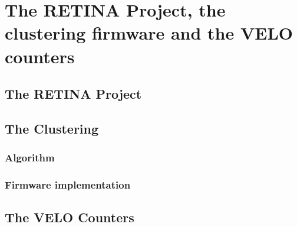 
\chapter{The RETINA Project, the clustering firmware and the VELO counters}
\label{chp:retina}
\section{The RETINA Project}
\section{The Clustering}
\subsection{Algorithm}
\subsection{Firmware implementation}

\section{The VELO Counters}



